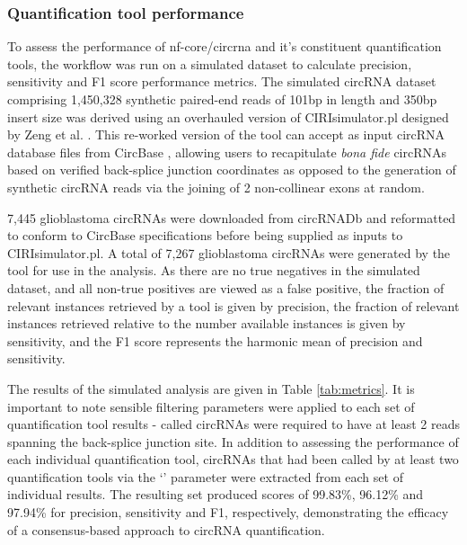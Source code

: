 \subsubsection{Quantification tool performance}
To assess the performance of nf-core/circrna and it's constituent quantification tools, the workflow was run on a simulated dataset to calculate precision, sensitivity and F1 score performance metrics. The simulated circRNA dataset comprising 1,450,328 synthetic paired-end reads of 101bp in length and 350bp insert size was derived using an overhauled version of CIRIsimulator.pl \cite{CIRI} designed by Zeng et al. \cite{Zeng2017Jun}. This re-worked version of the tool can accept as input circRNA database files from CircBase \cite{circbase}, allowing users to recapitulate \textit{bona fide} circRNAs based on verified back-splice junction coordinates as opposed to the generation of synthetic circRNA reads via the joining of 2 non-collinear exons at random. \par 
7,445 glioblastoma circRNAs were downloaded from circRNADb \cite{circrnadb} and reformatted to conform to CircBase specifications before being supplied as inputs to CIRIsimulator.pl. A total of 7,267 glioblastoma circRNAs were generated by the tool for use in the analysis. As there are no true negatives in the simulated dataset, and all non-true positives are viewed as a false positive, the fraction of relevant instances retrieved by a tool is given by precision, the fraction of relevant instances retrieved relative to the number available instances is given by sensitivity, and the F1 score represents the harmonic mean of precision and sensitivity.  \par
The results of the simulated analysis are given in Table \ref{tab:metrics}. It is important to note sensible filtering parameters were applied to each set of quantification tool results - called circRNAs were required to have at least 2 reads spanning the back-splice junction site. In addition to assessing the performance of each individual quantification tool, circRNAs that had been called by at least two quantification tools via the `' parameter were extracted from each set of individual results. The resulting set produced scores of 99.83\%, 96.12\% and 97.94\% for precision, sensitivity and F1, respectively, demonstrating the efficacy of a consensus-based approach to circRNA quantification. 



